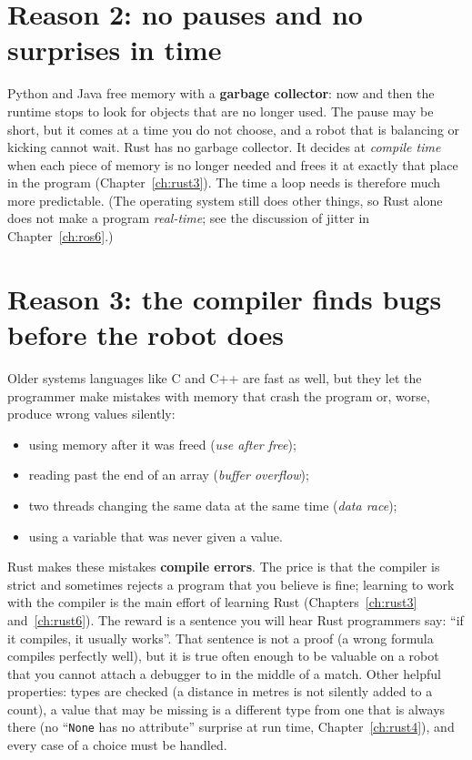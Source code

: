\section*{Reason 2: no pauses and no surprises in time}
Python and Java free memory with a \textbf{garbage collector}: now and then the runtime stops to look for objects that are no longer used. The pause may be short, but it comes at a time you do not choose, and a robot that is balancing or kicking cannot wait. Rust has no garbage collector. It decides at \emph{compile time} when each piece of memory is no longer needed and frees it at exactly that place in the program (Chapter~\ref{ch:rust3}). The time a loop needs is therefore much more predictable. (The operating system still does other things, so Rust alone does not make a program \emph{real-time}; see the discussion of jitter in Chapter~\ref{ch:ros6}.)

\section*{Reason 3: the compiler finds bugs before the robot does}
Older systems languages like C and C++ are fast as well, but they let the programmer make mistakes with memory that crash the program or, worse, produce wrong values silently:
\begin{itemize}[nosep]
\item using memory after it was freed (\emph{use after free});
\item reading past the end of an array (\emph{buffer overflow});
\item two threads changing the same data at the same time (\emph{data race});
\item using a variable that was never given a value.
\end{itemize}
Rust makes these mistakes \textbf{compile errors}. The price is that the compiler is strict and sometimes rejects a program that you believe is fine; learning to work with the compiler is the main effort of learning Rust (Chapters~\ref{ch:rust3} and~\ref{ch:rust6}). The reward is a sentence you will hear Rust programmers say: ``if it compiles, it usually works''. That sentence is not a proof (a wrong formula compiles perfectly well), but it is true often enough to be valuable on a robot that you cannot attach a debugger to in the middle of a match.
Other helpful properties: types are checked (a distance in metres is not silently added to a count), a value that may be missing is a different type from one that is always there (no ``\verb!None! has no attribute'' surprise at run time, Chapter~\ref{ch:rust4}), and every case of a choice must be handled.

